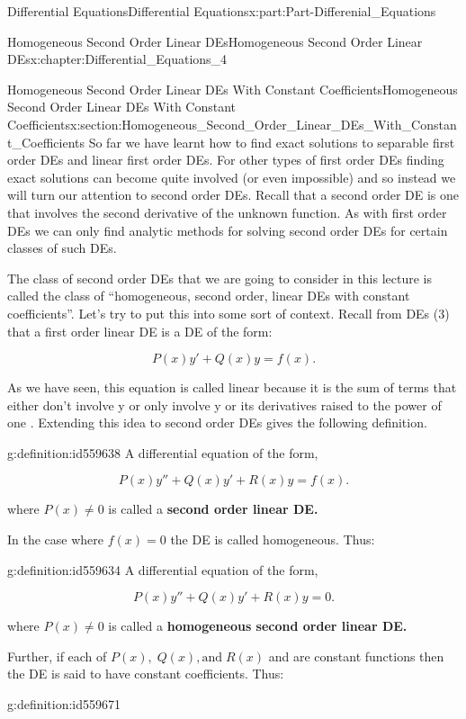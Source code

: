 \documentclass[oneside,10pt,]{book}
\newcommand{\terminology}[1]{\textbf{#1}}
\numberwithin{equation}{section}
\begin{document}
\begin{partptx}{Differential Equations}{}{Differential Equations}{}{}{x:part:Part-Differenial_Equations}
\begin{chapterptx}{Homogeneous Second Order Linear DEs}{}{Homogeneous Second Order Linear DEs}{}{}{x:chapter:Differential_Equations_4}
\begin{sectionptx}{Homogeneous Second Order Linear DEs With Constant Coefficients}{}{Homogeneous Second Order Linear DEs With Constant Coefficients}{}{}{x:section:Homogeneous_Second_Order_Linear_DEs_With_Constant_Coefficients}
So far we have learnt how to find exact solutions to separable first order DEs and linear first order DEs. For other types of first order DEs finding exact solutions can become quite involved (or even impossible) and so instead we will turn our attention to second order DEs. Recall that a second order DE is one that involves the second derivative of the unknown function. As with first order DEs we can only find analytic methods for solving second order DEs for certain classes of such DEs.%
\par
The class of second order DEs that we are going to consider in this lecture is called the class of “homogeneous, second order, linear DEs with constant coefficients”. Let’s try to put this into some sort of context. Recall from DEs (\(3 \)) that a first order linear DE is a DE of the form:%
\par
%
\begin{equation*}
P(x)y'+Q(x)y=f(x).
\end{equation*}
%
\par
As we have seen, this equation is called linear because it is the sum of terms that either don’t involve y or only involve y or its derivatives raised to the power of one . Extending this idea to second order DEs gives the following definition.%
\begin{definition}{}{g:definition:id559638}%
A differential equation of the form,%
\par
%
\begin{equation*}
P(x)y''+Q(x)y'+R(x)y=f(x) \text{.}
\end{equation*}
%
\par
where \(P(x)\neq 0 \) is called a \terminology{second order linear DE.}%
\end{definition}
In the case where   \(f(x)= 0 \) the DE is called homogeneous. Thus:%
\begin{definition}{}{g:definition:id559634}%
A differential equation of the form,%
\par
%
\begin{equation*}
P(x)y''+Q(x)y'+R(x)y=0 \text{.}
\end{equation*}
%
\par
where \(P(x)\neq 0 \) is called a \terminology{homogeneous second order linear DE.}%
\end{definition}
Further, if each of  \(P(x),\; Q(x), \text{and}\; R(x) \)   and   are constant functions then the DE is said to have constant coefficients. Thus:%
\begin{definition}{}{g:definition:id559671}%

\end{definition}
\end{sectionptx}
\end{chapterptx}
\end{partptx}
\end{document}
